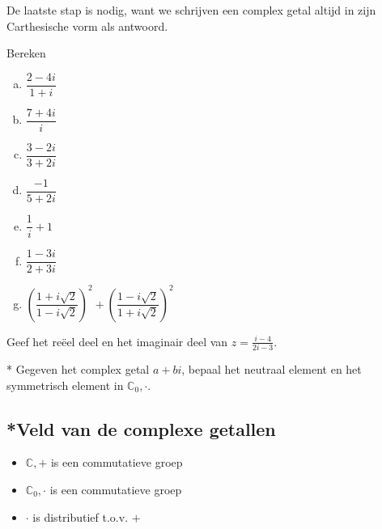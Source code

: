 \documentclass[12pt,twoside,a4]{article}
\begin{document}
De laatste stap is nodig, want we schrijven een complex getal altijd in zijn Carthesische vorm als antwoord.

\begin{oefening}
  Bereken
  \begin{multicols}{2}
  \begin{enumerate}[(a)]
  \itemsep1em
  \item $\displaystyle \dfrac{2-4i}{1+i}$
  \item $\displaystyle \dfrac{7+4i}{i}$
  \item $\displaystyle \dfrac{3-2i}{3+2i}$
  \item $\displaystyle \dfrac{-1}{5+2i}$
  \item $\displaystyle \dfrac{1}{i}+1$
  \item $\displaystyle \dfrac{1-3i}{2+3i}$
  \item $\displaystyle \left(\dfrac{1+i\sqrt{2}}{1-i\sqrt{2}}\right)^2+\left(\dfrac{1-i\sqrt{2}}{1+i\sqrt{2}}\right)^2$
  \end{enumerate}
  \end{multicols}
\end{oefening}

\begin{oefening}
  Geef het reëel deel en het imaginair deel van $z=\frac{i-4}{2i-3}$.
\end{oefening}

\begin{oefening}*
  Gegeven het complex getal $a+bi$, bepaal het neutraal element en het symmetrisch element in $\mathbb{C}_0, \cdot$.
\end{oefening}

\subsection{*Veld van de complexe getallen}

\begin{itemize}
  \item $\mathbb{C},+$ is een commutatieve groep
  \item $\mathbb{C}_0,\cdot$ is een commutatieve groep
  \item $\cdot$ is distributief t.o.v. $+$
\end{itemize}
\end{document}
